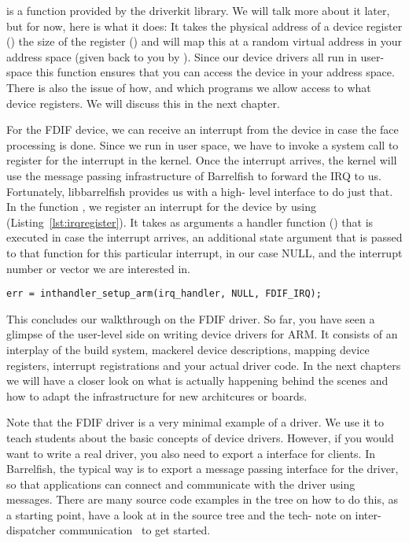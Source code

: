 \documentclass[a4paper,11pt,twoside]{report}
\begin{document}
 is a function provided by the driverkit
library. We will talk more about it later, but for now, here is what it does:
It takes the physical address of a device register () the
size of the register () and will map this at a random virtual
address in your address space (given back to you by ). Since
our device drivers all run in user-space this function ensures that you can
access the device in your address space. There is also the issue of how, and
which programs we allow access to what device registers. We will discuss this
in the next chapter.

For the FDIF device, we can receive an interrupt from the device in case
the face processing is done. Since we run in user space, we have to invoke a
system call to register for the interrupt in the kernel. Once the interrupt
arrives, the kernel will use the message passing infrastructure of Barrelfish
to forward the IRQ to us. Fortunately, libbarrelfish provides us with a high-
level interface to do just that. In the function ,
we register an interrupt for the device by using
 (Listing~\ref{lst:irqregister}). It takes as
arguments a handler function () that is executed in case
the interrupt arrives, an additional state argument that is passed to that
function for this particular interrupt, in our case NULL, and the interrupt
number or vector we are interested in.

\begin{lstlisting}[caption={Register to receive an Interrupt.}, label={lst:irqregister}]
err = inthandler_setup_arm(irq_handler, NULL, FDIF_IRQ);
\end{lstlisting}

This concludes our walkthrough on the FDIF driver. So far, you have seen a
glimpse of the user-level side on writing device drivers for ARM. It consists
of an interplay of the build system, mackerel device descriptions,  mapping
device registers, interrupt registrations and your actual driver code. In the
next chapters we will have a closer look on what is actually happening behind
the scenes and how to adapt the infrastructure for new architcures or boards.

Note that the FDIF driver is a very minimal example of a driver. We use it to
teach students about the basic concepts of device drivers. However, if you
would want to write a real driver, you also need to export a interface for
clients. In Barrelfish, the typical way is to export a message passing
interface for the driver, so that applications can connect and communicate
with the driver using messages. There are many source code examples in the
tree on how to do this, as a starting point, have a look at
 in the source tree and the tech-
note on inter-dispatcher communication~\cite{btn011-idc} to get started.
\end{document}
